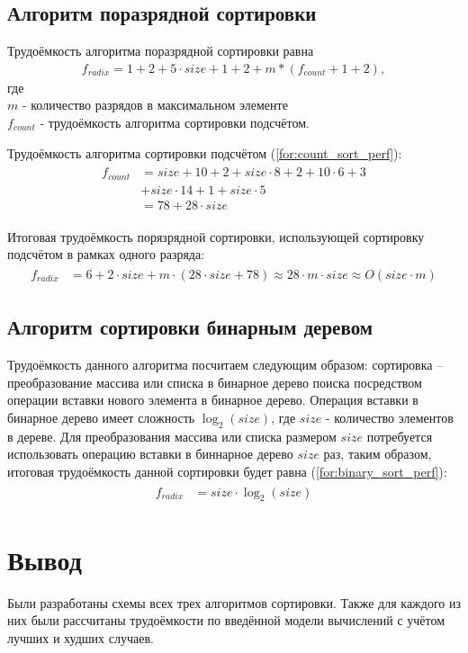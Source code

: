 \subsection{Алгоритм поразрядной сортировки}

Трудоёмкость алгоритма поразрядной сортировки равна %
\begin{align}
	\label{for:radix_sort_perf}
    f_{radix} = 1 + 2 + 5 \cdot size + 1 + 2 + m * (f_{count} + 1 + 2),
\end{align}
где \\
$m$ - количество разрядов в максимальном элементе \\
$f_{count}$ - трудоёмкость алгоритма сортировки подсчётом.


Трудоёмкость алгоритма сортировки подсчётом (\ref{for:count_sort_perf}):
\begin{align}
\begin{split}
	\label{for:count_sort_perf}
    f_{count} &= size + 10  + 2 + size \cdot 8 + 2 + 10 \cdot 6 + 3 \\
    &+ size \cdot 14 + 1 + size \cdot 5 \\
    &= 78 + 28 \cdot size
\end{split}
\end{align}

Итоговая трудоёмкость порязрядной сортировки, использующей сортировку подсчётом в рамках одного разряда: %
\begin{align}
\begin{split}
	\label{for:total_radix}
	f_{radix} &= 6 + 2 \cdot size + m \cdot (28 \cdot size + 78) \approx 28 \cdot m \cdot size \approx O(size\cdot m)
\end{split}
\end{align}

\subsection{Алгоритм сортировки бинарным деревом}
Трудоёмкость данного алгоритма посчитаем следующим образом: сортировка -- преобразование массива или списка в бинарное дерево поиска посредством операции вставки нового элемента в бинарное дерево.
Операция вставки в бинарное дерево имеет сложность $ \log_{2}(size)$, где $size$ - количество элементов в дереве.
Для преобразования массива или списка размером $size$ потребуется использовать операцию вставки в биннарное дерево $size$ раз, таким образом, итоговая трудоёмкость данной сортировки будет равна (\ref{for:binary_sort_perf}):
\begin{align}
\begin{split}
	\label{for:binary_sort_perf}
	f_{radix} &= size \cdot \log_{2}(size)
\end{split}
\end{align}


\section*{Вывод}

Были разработаны схемы всех трех алгоритмов сортировки. Также для каждого из них были рассчитаны трудоёмкости по введённой модели вычислений с учётом лучших и худших случаев.
